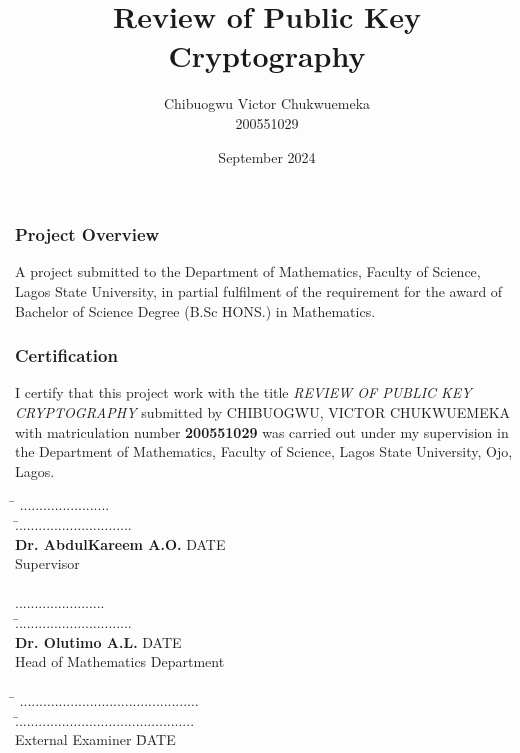 \documentclass{beamer}
\title{Review of Public Key Cryptography}
\author{Chibuogwu Victor Chukwuemeka \\ 200551029}
\institute{Department of Mathematics \\ Faculty of Science \\ Lagos State University}
\date{September 2024}
\begin{document}
\begin{frame}
    \titlepage
\end{frame}

\begin{frame}
    \frametitle{Project Overview}
    A project submitted to the Department of Mathematics, Faculty of Science, Lagos State University, in partial fulfilment of the requirement for the award of Bachelor of Science Degree (B.Sc HONS.) in Mathematics.
\end{frame}

\begin{frame}
    \frametitle{Certification}
    \begin{flushleft}
    \end{flushleft}
    \vspace{1cm}
    I certify that this project work with the title \emph{\large REVIEW OF PUBLIC KEY CRYPTOGRAPHY} submitted by CHIBUOGWU, VICTOR CHUKWUEMEKA with matriculation number \textbf{200551029} was carried out under my supervision in the Department of Mathematics, Faculty of Science, Lagos State University, Ojo, Lagos.
    \\    
    \vspace{1.5cm}
    \begin{tabbing}
        \hspace{5cm} \= \kill
        \> ....................... \\
        \> \hspace{7cm} \= .............................. \\
        \> \textbf{Dr. AbdulKareem A.O.} \hspace{6.2cm} DATE \\
        \> Supervisor \\
        \> \\
        \> ....................... \\
        \> \hspace{7cm} \= .............................. \\
        \> \textbf{Dr. Olutimo A.L.} \hspace{6cm} DATE \\
        \> Head of Mathematics Department \\
        \> \\
        \> \hspace{2cm} \= \kill
        \> .............................................. \\
        \> \hspace{10cm} \= .............................................. \\
        \> External Examiner \hspace{2cm} \= DATE \\
    \end{tabbing}
\end{frame}
\end{document}
